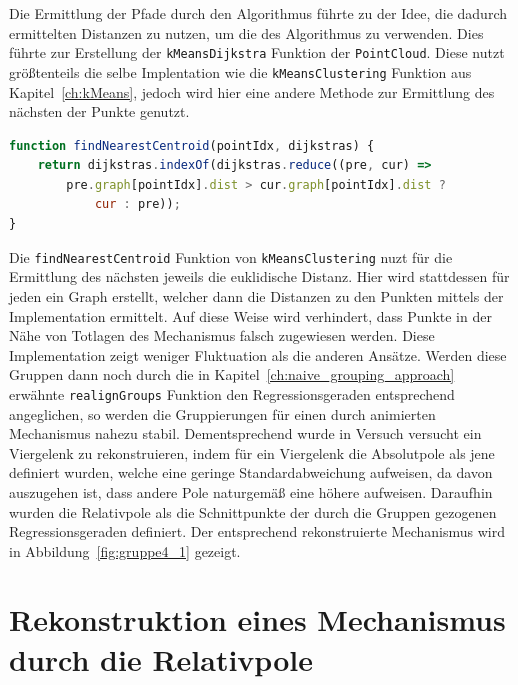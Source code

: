 Die Ermittlung der Pfade durch den  Algorithmus führte zu der Idee, die dadurch ermittelten Distanzen zu nutzen, um die  des  Algorithmus zu verwenden.
Dies führte zur Erstellung der \lstinline{kMeansDijkstra} Funktion der \lstinline{PointCloud}.
Diese nutzt grö{\ss}tenteils die selbe Implentation wie die \lstinline{kMeansClustering} Funktion aus Kapitel~\ref{ch:kMeans}, jedoch wird hier eine andere Methode zur Ermittlung des nächsten  der Punkte genutzt.

\begin{lstlisting}[language=JavaScript, caption={Bestimmung des nächsten \name{Centroids} in der \lstinline{kMeansDijkstra} Funktion.}, label={lst:findNearestCentroidDijkstra}]
function findNearestCentroid(pointIdx, dijkstras) {
    return dijkstras.indexOf(dijkstras.reduce((pre, cur) =>
        pre.graph[pointIdx].dist > cur.graph[pointIdx].dist ?
            cur : pre));
}
\end{lstlisting}

Die \lstinline{findNearestCentroid} Funktion von \lstinline{kMeansClustering} nuzt für die Ermittlung des nächsten  jeweils die euklidische Distanz.
Hier wird stattdessen für jeden  ein Graph erstellt, welcher dann die Distanzen zu den Punkten mittels der  Implementation ermittelt.
Auf diese Weise wird verhindert, dass Punkte in der Nähe von Totlagen des Mechanismus falsch zugewiesen werden.
Diese Implementation zeigt weniger Fluktuation als die anderen Ansätze.
Werden diese Gruppen dann noch durch die in Kapitel~\ref{ch:naive_grouping_approach} erwähnte \lstinline{realignGroups} Funktion den Regressionsgeraden entsprechend angeglichen, so werden die Gruppierungen für einen durch  animierten Mechanismus nahezu stabil.
Dementsprechend wurde in Versuch  versucht ein Viergelenk zu rekonstruieren, indem für ein Viergelenk die Absolutpole als jene definiert wurden, welche eine geringe Standardabweichung aufweisen, da davon auszugehen ist, dass andere Pole naturgemä{\ss} eine höhere aufweisen.
Daraufhin wurden die Relativpole als die Schnittpunkte der durch die Gruppen gezogenen Regressionsgeraden definiert.
Der entsprechend rekonstruierte Mechanismus wird in Abbildung~\ref{fig:gruppe4_1} gezeigt.

\section{Rekonstruktion eines Mechanismus durch die Relativpole}

